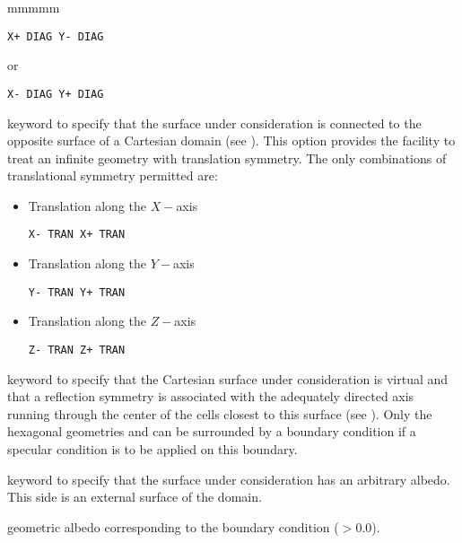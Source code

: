 \begin{ListeDeDescription}{mmmmm}
\begin{verbatim}
X+ DIAG Y- DIAG 
\end{verbatim}

\noindent
or

\begin{verbatim}
X- DIAG Y+ DIAG 
\end{verbatim}

\item[\moc{TRAN}] keyword to specify that the surface under consideration is
connected to the opposite surface of a Cartesian domain (see ).
This option  provides
the facility to treat an infinite geometry with translation symmetry. The only
combinations of translational symmetry permitted are:

\begin{itemize}
\item Translation along the $X-$axis

\begin{verbatim}
X- TRAN X+ TRAN 
\end{verbatim}

\item Translation along the $Y-$axis

\begin{verbatim}
Y- TRAN Y+ TRAN 
\end{verbatim}

\item Translation along the $Z-$axis

\begin{verbatim}
Z- TRAN Z+ TRAN 
\end{verbatim}

\end{itemize}

\item[\moc{SYME}] keyword to specify that the Cartesian surface under
consideration is virtual and that a reflection symmetry is associated with the
adequately directed axis running through the center of the cells closest to this
surface (see ). Only the hexagonal geometries  and  can be
surrounded by a  boundary condition if a specular condition
is to be applied on this boundary.

\item[\moc{ALBE}] keyword to specify that the surface under consideration has
an arbitrary albedo. This side is an external surface of the domain.

\item[\dusa{albedo}] geometric albedo corresponding to the boundary condition
 ($>$0.0). 


\end{ListeDeDescription}
